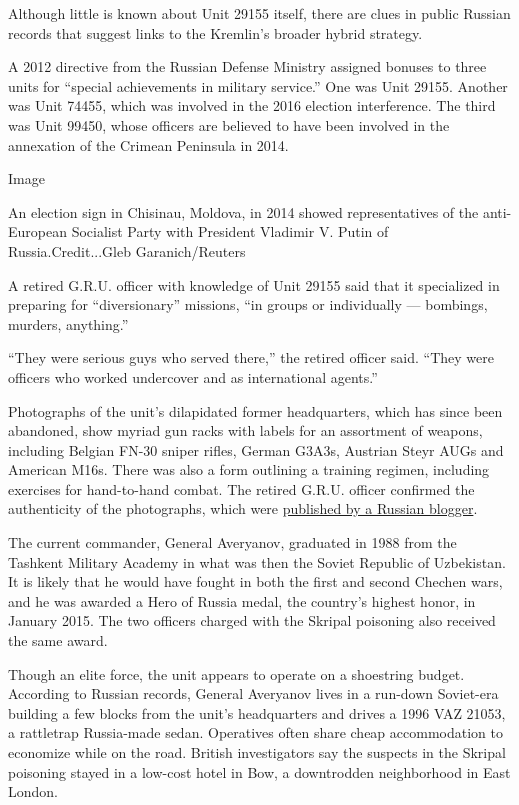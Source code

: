 Although little is known about Unit 29155 itself, there are clues in
public Russian records that suggest links to the Kremlin's broader
hybrid strategy.

A 2012 directive from the Russian Defense Ministry assigned bonuses to
three units for ``special achievements in military service.'' One was
Unit 29155. Another was Unit 74455, which was involved in the 2016
election interference. The third was Unit 99450, whose officers are
believed to have been involved in the annexation of the Crimean
Peninsula in 2014.

Image

An election sign in Chisinau, Moldova, in 2014 showed representatives of
the anti-European Socialist Party with President Vladimir V. Putin of
Russia.Credit...Gleb Garanich/Reuters

A retired G.R.U. officer with knowledge of Unit 29155 said that it
specialized in preparing for ``diversionary'' missions, ``in groups or
individually --- bombings, murders, anything.''

``They were serious guys who served there,'' the retired officer said.
``They were officers who worked undercover and as international
agents.''

Photographs of the unit's dilapidated former headquarters, which has
since been abandoned, show myriad gun racks with labels for an
assortment of weapons, including Belgian FN-30 sniper rifles, German
G3A3s, Austrian Steyr AUGs and American M16s. There was also a form
outlining a training regimen, including exercises for hand-to-hand
combat. The retired G.R.U. officer confirmed the authenticity of the
photographs, which were
\href{https://podpolkovnikvvs.livejournal.com/222086.html}{published by
a Russian blogger}.

The current commander, General Averyanov, graduated in 1988 from the
Tashkent Military Academy in what was then the Soviet Republic of
Uzbekistan. It is likely that he would have fought in both the first and
second Chechen wars, and he was awarded a Hero of Russia medal, the
country's highest honor, in January 2015. The two officers charged with
the Skripal poisoning also received the same award.

Though an elite force, the unit appears to operate on a shoestring
budget. According to Russian records, General Averyanov lives in a
run-down Soviet-era building a few blocks from the unit's headquarters
and drives a 1996 VAZ 21053, a rattletrap Russia-made sedan. Operatives
often share cheap accommodation to economize while on the road. British
investigators say the suspects in the Skripal poisoning stayed in a
low-cost hotel in Bow, a downtrodden neighborhood in East London.


